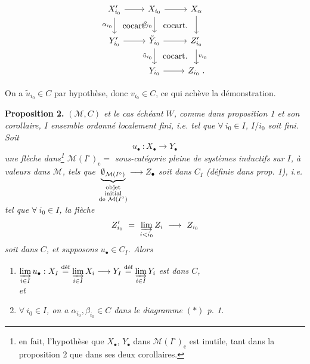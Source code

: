 \documentclass[11pt]{article}
\newcommand{\printedpage}[1]{\marginpar{\footnotesize p.~#1}}
\newcommand{\msp}[1]{\marginpar{\footnotesize [#1]}}
\newcommand{\defeq}{\overset{\textup{déf}}{=}}
\newcommand{\cocart}{\textup{cocart.}}
\begin{document}
\setcounter{footnote}{4}

\printedpage{4}

\msp{page 7}

\[
\begin{tikzcd}
X'_{i_0} \arrow[r] \arrow[d, "\alpha_{i_0}"'] \arrow[dr, phantom, "\cocart"] & X_{i_0} \arrow[r] \arrow[d, "\beta_{i_0}"'] \arrow[dr, phantom, "\cocart"] & X_{\alpha} \arrow[d] \\
Y'_{i_0} \arrow[r] & \tilde{Y}_{i_0} \arrow[r] \arrow[d, "\tilde{u}_{i_0}"'] \arrow[dr, phantom, "\cocart"] & Z'_{i_0} \arrow[d, "v_{i_0}"] \\
& Y_{i_0} \arrow[r] & Z_{i_0}\ .
\end{tikzcd}
\]

On a $\tilde{u}_{i_0} \in C$ par hypothèse, donc $v_{i_0} \in C$, ce qui achève la démonstration.

\textbf{Proposition 2.} \textit{$(\mathcal{M}, C)$ et le cas échéant $W$, comme dans proposition 1 et son corollaire, $I$ ensemble ordonné localement fini, i.e. tel que $\forall\ i_0 \in I$, $I/i_0$ soit fini. Soit}
\[
u_{\bullet}\ : X_{\bullet} \longrightarrow Y_{\bullet}
\]
\textit{une flèche dans\footnote{en fait, l'hypothèse que $X_{\bullet}$, $Y_{\bullet}$ dans $\mathcal{M}(I^{\circ})_{\mathrm{c}}$ est inutile, tant dans la proposition 2 que dans ses deux corollaires.} $\mathcal{M}(I^{\circ})_{\mathrm{c}} =$ sous-catégorie pleine de systèmes inductifs sur $I$, à valeurs dans $\mathcal{M}$, tels que $\underbrace{\emptyset_{\mathcal{M}(I^{\circ})}}_{\substack{\textup{objet}\\ \textup{initial}\\ \textup{de } \mathcal{M}(I^{\circ})}} \longrightarrow Z_{\bullet}$ soit dans $C_I$ (définie dans prop. 1), i.e. tel que $\forall\ i_0 \in I$, la flèche}
\[
Z'_{i_0} \ = \ \varinjlim_{i < i_0} Z_i \ \longrightarrow \ Z_{i_0}
\]
\textit{soit dans $C$, et supposons $u_{\bullet} \in C_I$. Alors}
\begin{enumerate}
\item[a)] $\varinjlim\limits_{i \in I} u_{\bullet} : X_I \defeq \varinjlim\limits_{i \in I} X_i \longrightarrow Y_I \defeq \varinjlim\limits_{i \in I} Y_i$ \textit{est dans $C$,}
\msp{page 8}\\
\textit{et}
\item[b)] \textit{$\forall\ i_0 \in I$, on a $\alpha_{i_0}, \beta_{i_0} \in C$ dans le diagramme $(*)$ p. 1.}
\end{enumerate}
\end{document}
